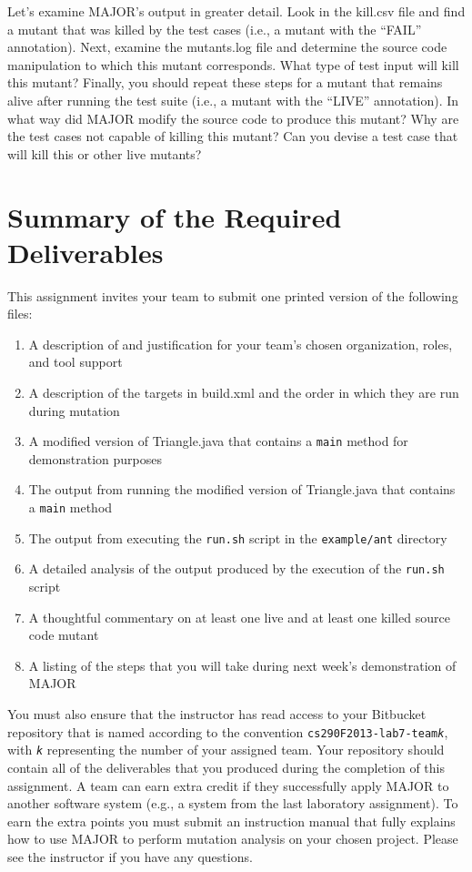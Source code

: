 Let's examine MAJOR's output in greater detail. Look in the kill.csv file and find a mutant that was killed by the test
cases (i.e., a mutant with the ``FAIL'' annotation). Next, examine the mutants.log file and determine the source code
manipulation to which this mutant corresponds.  What type of test input will kill this mutant?  Finally, you should
repeat these steps for a mutant that remains alive after running the test suite (i.e., a mutant with the ``LIVE''
annotation). In what way did MAJOR modify the source code to produce this mutant? Why are the test cases not capable of
killing this mutant?  Can you devise a test case that will kill this or other live mutants?

\section*{Summary of the Required Deliverables}

This assignment invites your team to submit one printed version of the following files:
\vspace*{-.1in}
\begin{enumerate}
	\itemsep0em 
	\item A description of and justification for your team's chosen organization, roles, and tool support
	\item A description of the targets in build.xml and the order in which they are run during mutation 
	\item A modified version of Triangle.java that contains a {\tt main} method for demonstration purposes
	\item The output from running the modified version of Triangle.java that contains a {\tt main} method
	\item The output from executing the {\tt run.sh} script in the {\tt example/ant} directory
	\item A detailed analysis of the output produced by the execution of the {\tt run.sh} script
	\item A thoughtful commentary on at least one live and at least one killed source code mutant
	\item A listing of the steps that you will take during next week's demonstration of MAJOR
\end{enumerate}
\vspace*{-.1in}

You must also ensure that the instructor has read access to your Bitbucket repository that is named according to the
convention {\tt cs290F2013-lab7-team{\em k}}, with {\tt {\em k}} representing the number of your assigned team.  Your
repository should contain all of the deliverables that you produced during the completion of this assignment.  A team
can earn extra credit if they successfully apply MAJOR to another software system (e.g., a system from the last
laboratory assignment). To earn the extra points you must submit an instruction manual that fully explains how to use
MAJOR to perform mutation analysis on your chosen project. Please see the instructor if you have any questions. 
 


